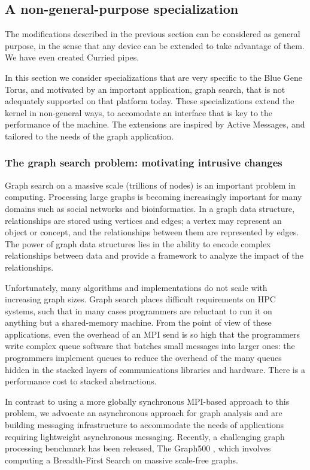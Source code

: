 \documentclass[letterpaper,twocolumn,10pt]{article}
\begin{document}
\subsection{A non-general-purpose specialization}
The modifications described in the previous section can be considered as general purpose, in the sense 
that any device can be extended to take advantage of them. We have even created Curried pipes. 

In this section we consider specializations that are very specific to the Blue Gene Torus, and motivated
by an important application, graph search, that is not adequately supported on that platform today. 
These specializations extend the kernel in non-general ways, to accomodate an interface that is key to the performance of the machine. 
The extensions are inspired by Active Messages\cite{von1992active},  and tailored to the needs of the graph application. 

\subsubsection{The graph search problem: motivating intrusive changes}

Graph search on a massive scale (trillions of nodes)
is an important problem in computing. 
Processing   large  graphs   is  becoming   increasingly  important
for  many domains such as social networks and bioinformatics. 
In a graph data structure,
relationships are stored using vertices and edges; a vertex
may represent an object or concept, and the relationships between them
are represented by edges.  The power of graph data structures lies in
the ability to encode complex relationships between data and provide a
framework to analyze the impact of the relationships.

Unfortunately, many algorithms and implementations do not
scale with increasing  graph sizes.  Graph search  places difficult requirements on HPC systems, such that in many cases
programmers are reluctant to run it on anything but a shared-memory machine. 
From the point of view of these applications, even the overhead of an MPI send is so high that the programmers write complex 
queue software that batches small messages into larger ones: the programmers implement queues to reduce the overhead of the many
queues hidden in the stacked layers  of communications libraries and hardware. There is a performance cost to stacked abstractions. 

In contrast to using a  more globally synchronous MPI-based
approach to this problem, we advocate an asynchronous approach for graph analysis\cite{Pearce2010}
and are building messaging infrastructure to accommodate the needs
of applications requiring lightweight asynchronous messaging.
Recently, a challenging graph processing benchmark has been released,
The Graph500 \cite{Graph500}, which involves computing a Breadth-First
Search on massive scale-free graphs.
\end{document}
